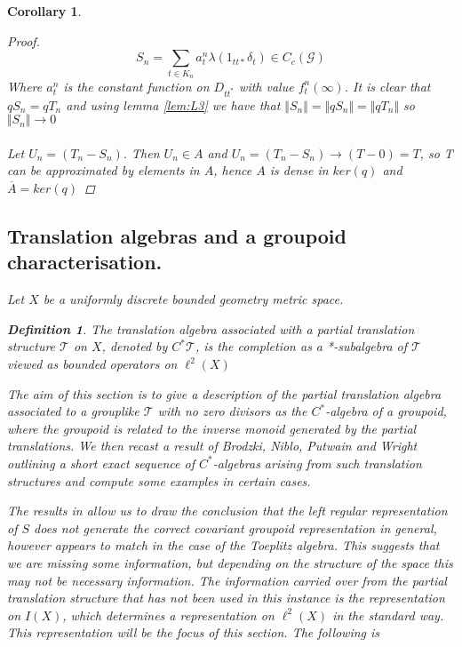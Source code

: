 \documentclass[11pt]{amsart}
\theoremstyle{plain}
\newtheorem{corollary}[theorem]{Corollary}%
\theoremstyle{definition}%
\newtheorem{definition}[theorem]{Definition}%
\theoremstyle{remark}%
\begin{document}
\begin{corollary}
\begin{proof}
\begin{equation}
S_{n} = \sum_{t \in K_{n}} a^{n}_{t}\lambda(1_{tt*}\delta_{t}) \in C_{c}(\mathcal{G})
\end{equation}
Where $a^{n}_{t}$ is the constant function on $D_{tt^{*}}$ with value $f_{t}^{n}(\infty)$. It is clear that $qS_{n}=qT_{n}$ and using lemma \ref{lem:L3} we have that $\Vert S_{n} \Vert = \Vert qS_{n} \Vert = \Vert qT_{n} \Vert$ so $\Vert S_{n} \Vert \rightarrow 0$\\
\\
Let $U_{n}=(T_{n}-S_{n})$. Then $U_{n} \in A$ and $U_{n}=(T_{n}-S_{n}) \rightarrow (T-0)=T$, so T can be approximated by elements in $A$, hence $A$ is dense in $ker(q)$ and $\overline{A}=ker(q)$
\end{proof} 

\subsection{Translation algebras and a groupoid characterisation.}

Let $X$ be a uniformly discrete bounded geometry metric space.

\begin{definition}
The translation algebra associated with a partial translation structure $\mathcal{T}$ on $X$, denoted by $C^{*}\mathcal{T}$, is the completion as a *-subalgebra of $\mathcal{T}$ viewed as bounded operators on $\ell^{2}(X)$
\end{definition}

The aim of this section is to give a description of the partial translation algebra associated to a grouplike $\mathcal{T}$ with no zero divisors as the $C^{*}$-algebra of a groupoid, where the groupoid is related to the inverse monoid generated by the partial translations. We then recast a result of Brodzki, Niblo, Putwain and Wright \cite[Theorem 8.3]{Rosiesthesis} outlining a short exact sequence of $C^{*}$-algebras arising from such translation structures and compute some examples in certain cases.

The results in \cite[Theorem 1, Theorem 2]{MR2457037} allow us to draw the conclusion that the left regular representation of $S$ does not generate the correct covariant groupoid representation in general, however appears to match in the case of the Toeplitz algebra. This suggests that we are missing some information, but depending on the structure of the space this may not be necessary information. The information carried over from the partial translation structure that has not been used in this instance is the representation on $I(X)$, which determines a representation on $\ell^{2}(X)$ in the standard way. This representation will be the focus of this section. The following is \cite[Prop 10.6]{MR2419901}


\end{corollary}
\end{document}
